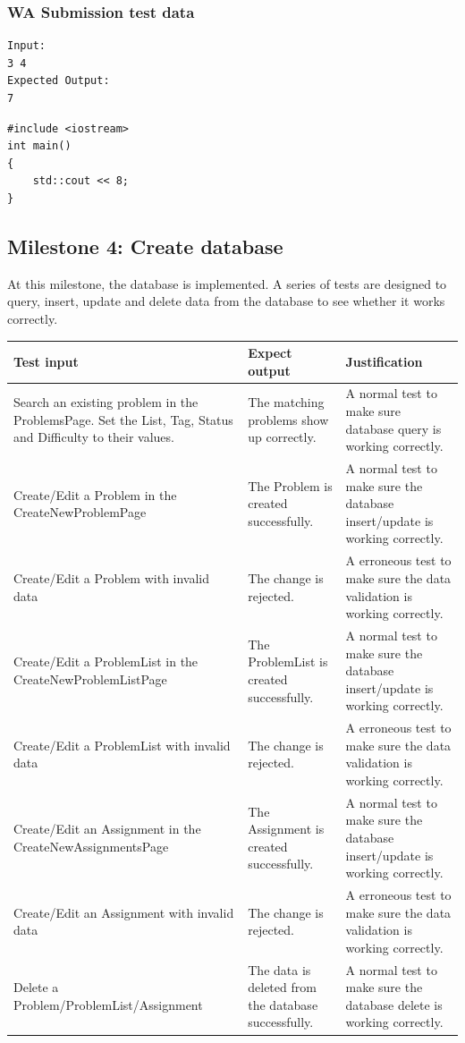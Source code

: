 \documentclass[a4paper]{report}
\begin{document}
\subsubsection{WA Submission test data}

\begin{verbatim}
Input:
3 4
Expected Output:
7 
\end{verbatim}

\begin{verbatim}
#include <iostream>
int main()
{
    std::cout << 8;
}
\end{verbatim}

\subsection{Milestone 4: Create database}

At this milestone, the database is implemented. A series of tests are designed to query, insert, update and delete data from the database to see whether it works correctly.

\begin{tabulary}{\textwidth}{|L|L|L|}
    \hline
    Test input & Expect output & Justification \\
    \hline
    Search an existing problem in the ProblemsPage. Set the List, Tag, Status and Difficulty to their values. & The matching problems show up correctly. & A normal test to make sure database query is working correctly. \\
    \hline
    Create/Edit a Problem in the CreateNewProblemPage & The Problem is created successfully. & A normal test to make sure the database insert/update is working correctly. \\
    \hline
    Create/Edit a Problem with invalid data & The change is rejected. & A erroneous test to make sure the data validation is working correctly. \\
    \hline
    Create/Edit a ProblemList in the CreateNewProblemListPage & The ProblemList is created successfully. & A normal test to make sure the database insert/update is working correctly. \\
    \hline
    Create/Edit a ProblemList with invalid data & The change is rejected. & A erroneous test to make sure the data validation is working correctly. \\
    \hline
    Create/Edit an Assignment in the CreateNewAssignmentsPage & The Assignment is created successfully. & A normal test to make sure the database insert/update is working correctly. \\
    \hline
    Create/Edit an Assignment with invalid data & The change is rejected. & A erroneous test to make sure the data validation is working correctly. \\
    \hline
    Delete a Problem/ProblemList/Assignment & The data is deleted from the database successfully. & A normal test to make sure the database delete is working correctly. \\
    \hline
\end{tabulary}
\end{document}
